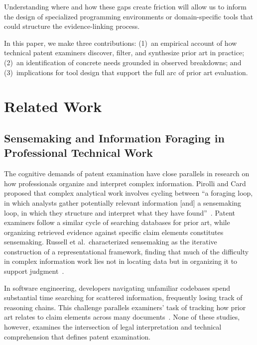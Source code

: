 \documentclass[sigconf]{acmart}
\begin{document}
Understanding where and how these gaps create friction will allow us to inform the design of specialized programming environments or domain-specific tools that could structure the evidence-linking process.

In this paper, we make three contributions: (1)~an empirical account of how technical patent examiners discover, filter, and synthesize prior art in practice; (2)~an identification of concrete needs grounded in observed breakdowns; and (3)~implications for tool design that support the full arc of prior art evaluation.

\section{Related Work}

\subsection{Sensemaking and Information Foraging in Professional Technical Work}

The cognitive demands of patent examination have close parallels in research on how professionals organize and interpret complex information. Pirolli and Card proposed that complex analytical work involves cycling between ``a foraging loop, in which analysts gather potentially relevant information [and] a sensemaking loop, in which they structure and interpret what they have found''~\cite{Pirolli2005}. Patent examiners follow a similar cycle of searching databases for prior art, while organizing retrieved evidence against specific claim elements constitutes sensemaking. Russell et al.\ characterized sensemaking as the iterative construction of a representational framework, finding that much of the difficulty in complex information work lies not in locating data but in organizing it to support judgment~\cite{Russell1993}.

In software engineering, developers navigating unfamiliar codebases spend substantial time searching for scattered information, frequently losing track of reasoning chains. This challenge parallels examiners' task of tracking how prior art relates to claim elements across many documents~\cite{Ko2006}. None of these studies, however, examines the intersection of legal interpretation and technical comprehension that defines patent examination.
\end{document}
